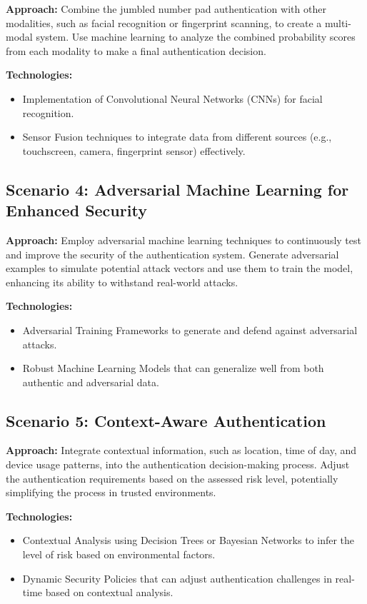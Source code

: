 \documentclass{article}
\begin{document}
\textbf{Approach:}
Combine the jumbled number pad authentication with other modalities, such as facial recognition or fingerprint scanning, to create a multi-modal system.
Use machine learning to analyze the combined probability scores from each modality to make a final authentication decision.

\textbf{Technologies:}
\begin{itemize}[label=--,leftmargin=*]
    \item Implementation of Convolutional Neural Networks (CNNs) for facial recognition.
    \item Sensor Fusion techniques to integrate data from different sources (e.g., touchscreen, camera, fingerprint sensor) effectively.
\end{itemize}

\subsection*{Scenario 4: Adversarial Machine Learning for Enhanced Security}

\textbf{Approach:}
Employ adversarial machine learning techniques to continuously test and improve the security of the authentication system.
Generate adversarial examples to simulate potential attack vectors and use them to train the model, enhancing its ability to withstand real-world attacks.

\textbf{Technologies:}
\begin{itemize}[label=--,leftmargin=*]
    \item Adversarial Training Frameworks to generate and defend against adversarial attacks.
    \item Robust Machine Learning Models that can generalize well from both authentic and adversarial data.
\end{itemize}

\subsection*{Scenario 5: Context-Aware Authentication}

\textbf{Approach:}
Integrate contextual information, such as location, time of day, and device usage patterns, into the authentication decision-making process.
Adjust the authentication requirements based on the assessed risk level, potentially simplifying the process in trusted environments.

\textbf{Technologies:}
\begin{itemize}[label=--,leftmargin=*]
    \item Contextual Analysis using Decision Trees or Bayesian Networks to infer the level of risk based on environmental factors.
    \item Dynamic Security Policies that can adjust authentication challenges in real-time based on contextual analysis.
\end{itemize}
\end{document}

